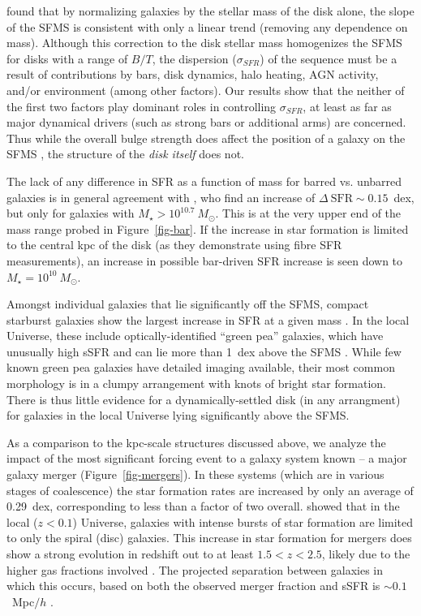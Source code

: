 \documentclass{emulateapj}
\begin{document}
\citet{abr14} found that by normalizing galaxies by the stellar mass of the disk alone, the slope of the SFMS is consistent with only a linear trend (removing any dependence on mass). Although this correction to the disk stellar mass homogenizes the SFMS for disks with a range of $B/T$, the dispersion ($\sigma_{SFR}$) of the sequence must be a result of contributions by bars, disk dynamics, halo heating, AGN activity, and/or environment (among other factors). Our results show that the neither of the first two factors play dominant roles in controlling $\sigma_{SFR}$, at least as far as major dynamical drivers (such as strong bars or additional arms) are concerned. Thus while the overall bulge strength does affect the position of a galaxy on the SFMS \citep{mar09,lan14,oma14}, the structure of the \emph{disk itself} does not.

The lack of any difference in SFR as a function of mass for barred vs. unbarred galaxies is in general agreement with \citet{ell11}, who find an increase of $\Delta~\textrm{SFR}\sim0.15$~dex, but only for galaxies with $M_\star>10^{10.7}~M_\odot$. This is at the very upper end of the mass range probed in Figure~\ref{fig-bar}. If the increase in star formation is limited to the central kpc of the disk (as they demonstrate using fibre SFR measurements), an increase in possible bar-driven SFR increase is seen down to $M_\star=10^{10}~M_\odot$. 

Amongst individual galaxies that lie significantly off the SFMS, compact starburst galaxies show the largest increase in SFR at a given mass \citep{elb11}. In the local Universe, these include optically-identified ``green pea'' galaxies, which have unusually high sSFR and can lie more than 1~dex above the SFMS \citep{car09}. While few known green pea galaxies have detailed imaging available, their most common morphology is in a clumpy arrangement with knots of bright star formation. There is thus little evidence for a dynamically-settled disk (in any arrangment) for galaxies in the local Universe lying significantly above the SFMS. 

As a comparison to the kpc-scale structures discussed above, we analyze the impact of the most significant forcing event to a galaxy system known -- a major galaxy merger (Figure~\ref{fig-mergers}). In these systems (which are in various stages of coalescence) the star formation rates are increased by only an average of 0.29~dex, corresponding to less than a factor of two overall. \citet{dar10} showed that in the local ($z<0.1$) Universe, galaxies with intense bursts of star formation are limited to only the spiral (disc) galaxies. This increase in star formation for mergers does show a strong evolution in redshift out to at least $1.5<z<2.5$, likely due to the higher gas fractions involved \citep{dad10,rod11}. The projected separation between galaxies in which this occurs, based on both the observed merger fraction and sSFR is $\sim0.1$~Mpc$/h$ \citep{ski09}.
\end{document}
